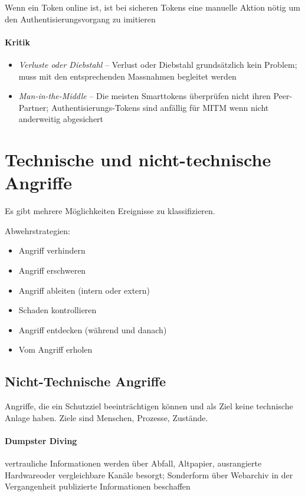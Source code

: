 \documentclass[a4paper,12pt]{article}
\begin{document}
Wenn ein Token online ist, ist bei sicheren Tokens eine manuelle Aktion nötig um den Authentisierungsvorgang zu imitieren

\paragraph{Kritik}

\begin{itemize}
\item \emph{Verluste oder Diebstahl} -- Verlust oder Diebstahl grundsätzlich kein Problem; muss mit den entsprechenden Massnahmen begleitet werden
\item \emph{Man-in-the-Middle} -- Die meisten Smarttokens überprüfen nicht ihren Peer-Partner; Authentisierungs-Tokens sind anfällig für MITM wenn nicht anderweitig abgesichert
\end{itemize}








\newpage
\section{Technische und nicht-technische Angriffe}
Es gibt mehrere Möglichkeiten Ereignisse zu klassifizieren.


Abwehrstrategien:
\begin{itemize}
\item Angriff verhindern
\item Angriff erschweren
\item Angriff ableiten (intern oder extern)
\item Schaden kontrollieren
\item Angriff entdecken (während und danach)
\item Vom Angriff erholen
\end{itemize}



\subsection{Nicht-Technische Angriffe}
Angriffe, die ein Schutzziel beeinträchtigen können und als Ziel keine technische Anlage haben. Ziele sind Menschen, Prozesse, Zustände.

\paragraph{Dumpster Diving} vertrauliche Informationen werden über Abfall, Altpapier, ausrangierte Hardwareoder vergleichbare Kanäle besorgt; Sonderform über Webarchiv in der Vergangenheit publizierte Informationen beschaffen
\end{document}
